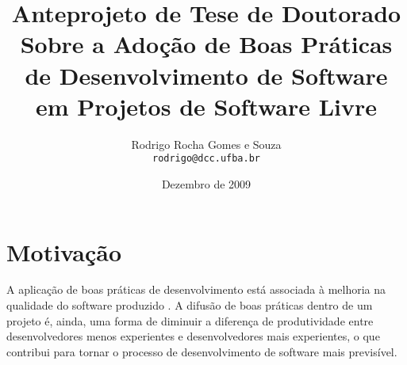 \documentclass{article}
\title{
{\small Anteprojeto de Tese de Doutorado}
\\
Sobre a Adoção de Boas Práticas 
de Desenvolvimento de Software 
em Projetos de Software Livre
%
}
\author{Rodrigo Rocha Gomes e Souza\\
\texttt{rodrigo@dcc.ufba.br}
}
\date{Dezembro de 2009}
\begin{document}
\sloppy
\maketitle





%



\section{Motivação} %

A aplicação de boas práticas de desenvolvimento está associada à melhoria na
qualidade do software produzido \cite{grady1993}. A difusão de boas práticas
dentro de um projeto é, ainda, uma forma de diminuir a diferença de
produtividade entre desenvolvedores menos experientes e desenvolvedores mais
experientes, o que contribui para tornar o processo de desenvolvimento de
software mais previsível.
\end{document}
